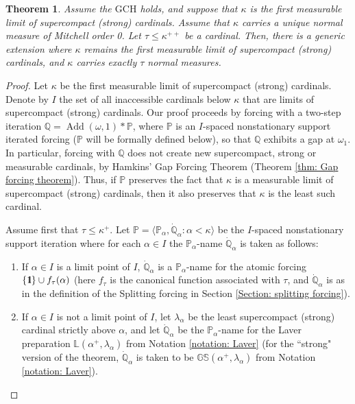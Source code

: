 \documentclass[11pt]{amsart}
\newtheorem{theorem}{Theorem}[section]
\theoremstyle{definition}
\theoremstyle{remark}
\newcommand\<{{<}}
\DeclareMathOperator{\Add}{Add}
\newcommand{\one}{\mathop{1\hskip-3pt {\rm l}}}
\newcommand{\po}{\mathbb{P}}
\newcommand{\qo}{\mathbb{Q}}
\begin{document}
\begin{theorem}\label{thm: first limit of supercompacts} 
  Assume the $\mathrm{GCH}$ holds, and  suppose that $\kappa$ is the first measurable limit of supercompact (strong) cardinals. Assume that $\kappa$ carries a unique normal measure of Mitchell order 0. Let $\tau\leq \kappa^{++}$ be a cardinal. Then, there is  a generic extension where $\kappa$ remains the first measurable limit of supercompact (strong) cardinals, and $\kappa$ carries exactly $\tau$ normal measures. 
\end{theorem}
\begin{proof}
  Let $\kappa$ be the first measurable limit of supercompact (strong) cardinals. Denote by $I$ the set of all inaccessible cardinals below $\kappa$ that are limits of supercompact (strong) cardinals. Our proof proceeds by forcing with a two-step iteration $\mathbb{Q}=\Add(\omega,1)\ast\mathbb{P}$, where $\mathbb{P}$ is an $I$-spaced nonstationary support iterated forcing ($\po$ will be formally defined below), so that $\mathbb{Q}$ exhibits a gap at $\omega_1$. In particular, forcing with $\mathbb{Q}$ does not create new supercompact, strong or measurable cardinals, by Hamkins' Gap Forcing Theorem (Theorem \ref{thm: Gap forcing theorem}). Thus, if $\mathbb{P}$ preserves the fact that $\kappa$ is a measurable limit of supercompact (strong) cardinals, then it also preserves that $\kappa$ is the least such cardinal.

   Assume first that $\tau\leq \kappa^{+}$. Let $\mathbb{P}=\langle \mathbb{P}_\alpha,  \dot{\mathbb{Q}}_\alpha\colon \alpha<\kappa\rangle$ be the $I$-spaced nonstationary support iteration where for each $\alpha\in I$ the $\mathbb{P}_\alpha$-name  $\dot{\mathbb{Q}}_\alpha$ is taken as follows:
   \begin{enumerate}
       \item If $\alpha\in I$ is a limit point of $I$, $\dot{\qo}_\alpha$ is a $\mathbb{P}_\alpha$-name for the atomic forcing  $\{\one\}\cup f_\tau(\alpha)$ (here $f_\tau$ is the canonical function associated with $\tau$, and $\dot{\qo}_\alpha$ is as in the definition of the Splitting forcing in Section \ref{Section: splitting forcing}).
       \item If $\alpha\in I$ is not a limit point of $I$, let $\lambda_\alpha$ be the least supercompact (strong) cardinal strictly above $\alpha$, and let $\dot{\qo}_\alpha$ be the $\po_\alpha$-name for the Laver preparation $\mathbb{L}(\alpha^+, \lambda_\alpha)$ from Notation \ref{notation: Laver} (for the ``strong" version of the theorem, $\dot{\qo}_\alpha$ is taken to be $\mathbb{GS}(\alpha^+, \lambda_\alpha)$ from Notation \ref{notation: Laver}).
   \end{enumerate}


\end{proof}
\end{document}

